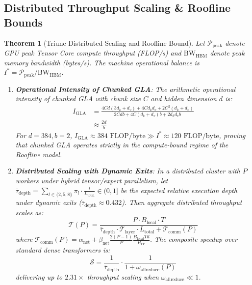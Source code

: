 \documentclass[10pt,twocolumn,letterpaper]{article}
\newtheorem{theorem}{Theorem}
\begin{document}
\subsection{Distributed Throughput Scaling \& Roofline Bounds}

\begin{theorem}[Triune Distributed Scaling and Roofline Bound]
\label{thm:roofline}
Let $\mathcal{P}_{\text{peak}}$ denote GPU peak Tensor Core compute throughput (FLOP/s) and $\text{BW}_{\text{HBM}}$ denote peak memory bandwidth (bytes/s). The machine operational balance is $I^* = \mathcal{P}_{\text{peak}} / \text{BW}_{\text{HBM}}$.
\begin{enumerate}
    \item \textbf{Operational Intensity of Chunked GLA}: The arithmetic operational intensity of chunked GLA with chunk size $C$ and hidden dimension $d$ is:
    \begin{equation}
    \begin{aligned}
        I_{\text{GLA}} &= \frac{4 C d (3 d_k + d_v) + 4 C d_k d_v + 2 C^2 (d_k + d_v)}{2 C d b + 4 C (d_k + d_v) b + 2 d_k d_v b} \\
        &\approx \frac{2 d}{b}
    \end{aligned}
    \end{equation}
    For $d=384, b=2$, $I_{\text{GLA}} \approx 384\text{ FLOP/byte} \gg I^* \approx 120\text{ FLOP/byte}$, proving that chunked GLA operates strictly in the compute-bound regime of the Roofline model.
    \item \textbf{Distributed Scaling with Dynamic Exits}: In a distributed cluster with $P$ workers under hybrid tensor/expert parallelism, let $\bar{\tau}_{\text{depth}} = \sum_{l \in \{2, 5, 8\}} \pi_l \cdot \frac{l}{L_{\text{total}}} \in (0, 1]$ be the expected relative execution depth under dynamic exits ($\bar{\tau}_{\text{depth}} \approx 0.432$). Then aggregate distributed throughput scales as:
    \begin{equation}
        \mathcal{T}(P) = \frac{P \cdot B_{\text{local}} \cdot T}{\bar{\tau}_{\text{depth}} \cdot \mathcal{T}_{\text{layer}} \cdot L_{\text{total}} + \mathcal{T}_{\text{comm}}(P)}
    \end{equation}
    where $\mathcal{T}_{\text{comm}}(P) = \alpha_{\text{net}} + \beta_{\text{net}} \frac{2(P-1)}{P} \frac{B_{\text{local}} T d}{P_{\text{TP}}}$. The composite speedup over standard dense transformers is:
    \begin{equation}
        \mathcal{S} = \frac{1}{\bar{\tau}_{\text{depth}}} \cdot \frac{1}{1 + \omega_{\text{allreduce}}(P)}
    \end{equation}
    delivering up to $2.31\times$ throughput scaling when $\omega_{\text{allreduce}} \ll 1$.
\end{enumerate}
\end{theorem}
\end{document}
